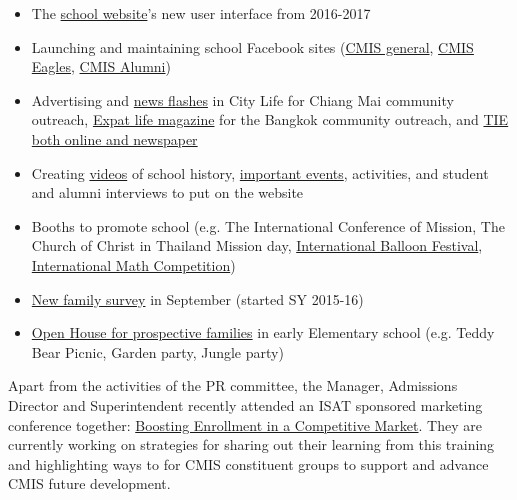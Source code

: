 \begin{findings}
\begin{itemize}
\item The \href{http://cmis.ac.th/}{school website}’s new user interface from 2016-2017
\item Launching and maintaining school Facebook sites (\href{https://www.facebook.com/cmis.th/}{CMIS general}, \href{https://www.facebook.com/cmis.eagles}{CMIS Eagles}, \href{https://www.facebook.com/cmis.alumni/}{CMIS Alumni})
\item Advertising and \href{http://www.chiangmaicitylife.com/citylife-articles/wow-what-a-year/}{news flashes} in City Life for Chiang Mai community outreach, \href{https://drive.google.com/a/cmis.ac.th/file/d/0B-CVlEN-TDChRkhmUTBnNjhaLUtvUDNCcm16eEdmYkFKWFk0/view?usp=sharing}{Expat life magazine} for the Bangkok community outreach, and \href{https://drive.google.com/a/cmis.ac.th/file/d/0B-CVlEN-TDChNWJ2NFZwM0QyR0U/view?usp=sharing}{TIE both online and newspaper}
\item Creating \href{https://www.youtube.com/channel/UCqVO5ckeUjOrxI1ElQaXM3g}{videos} of school history, \href{http://blogs.cmis.ac.th/newsletter/}{important events}, activities, and student and alumni interviews to put on the website
\item Booths to promote school (e.g. The International Conference of Mission, The Church of Christ in Thailand Mission day,  \href{https://www.facebook.com/cmis.th/photos/a.184627431732507.1073741831.175187506009833/465899696938611/?type=3&theater}{International Balloon Festival}, \href{http://blogs.cmis.ac.th/newsletter/2016/08/17/cmis-participating-thailand-international-mathematics-school-model-exhibition-2016/}{International Math Competition})
\item \href{https://docs.google.com/a/cmis.ac.th/forms/d/1basukpCBjcCMWXDh-cUUWW6lgk6zxYadGMn1EzFDQwc/edit}{New family survey} in September (started SY 2015-16)
\item \href{https://drive.google.com/drive/folders/0B0TYmzaZNi3fU3JWR2FFbndiR2s?usp=sharing}{Open House for prospective families} in early Elementary school (e.g. Teddy Bear Picnic, Garden party, Jungle party)
\end{itemize}

Apart from the activities of the PR committee, the Manager, Admissions Director and Superintendent recently attended an ISAT sponsored marketing conference together: \href{http://www.isat.or.th/news/isat-professional-development-workshop}{Boosting Enrollment in a Competitive Market}. They are currently working on strategies for sharing out their learning from this training and highlighting ways to for CMIS constituent groups to support and advance CMIS future development.


\end{findings}
